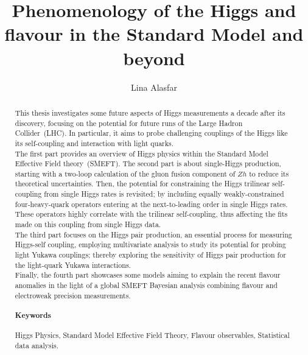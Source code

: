 \documentclass[12pt]{article}
\title{\bf{Phenomenology of the Higgs and flavour in the Standard Model and beyond }}
\author{Lina Alasfar}
\affil[1]{\emph{\normalsize Humboldt-Universit\"at zu Berlin, Institut f\"ur Physik,
Newtonstr.~15, 12489 Berlin,  Germany.}}
\date{}
\begin{document}
	\maketitle
{}
\begin{abstract}
	This thesis investigates some future aspects of Higgs measurements a decade after its discovery, focusing on the potential for future runs of the Large Hadron Collider~(LHC).  In particular, it aims to probe challenging couplings of the Higgs like its self-coupling and interaction with light quarks.\\ The first part provides an overview of Higgs physics within the Standard Model Effective Field theory~(SMEFT). The second part is about single-Higgs production, starting with a two-loop calculation of the gluon fusion component of $Zh$ to reduce its theoretical uncertainties. Then, the potential for constraining the Higgs trilinear self-coupling from single Higgs rates is revisited; by including equally weakly-constrained four-heavy-quark operators entering at the next-to-leading order in single Higgs rates.  These operators highly correlate with the trilinear self-coupling, thus affecting the fits made on this coupling from single Higgs data.  \\ The third part focuses on the Higgs pair production, an essential process for measuring Higgs-self coupling, employing multivariate analysis to study its potential for probing light Yukawa couplings; thereby exploring the sensitivity of Higgs pair production for the light-quark Yukawa interactions.\\ Finally, the fourth part showcases some models aiming to explain the recent flavour anomalies in the light of a global SMEFT Bayesian analysis combining flavour and electroweak precision measurements. 
	\paragraph{Keywords\color{gray}{:}} Higgs Physics, Standard Model Effective Field Theory, Flavour observables, Statistical data analysis.
\end{abstract}

\cleardoublepage
\end{document}
